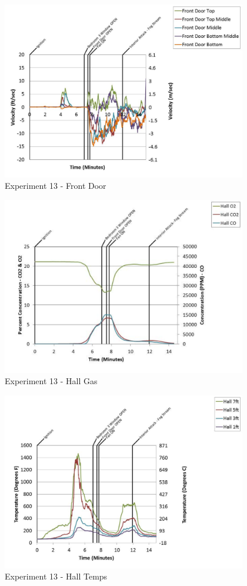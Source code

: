 \documentclass{article}
\begin{document}
\begin{appendices}
	\begin{figure}[h!]
		\centering
		\includegraphics[height=3.05in]{0_Images/Results_Charts/Exp_13_Charts/FrontDoor.pdf}
		\caption{Experiment 13 - Front Door}
	\end{figure}
 
	\clearpage

	\begin{figure}[h!]
		\centering
		\includegraphics[height=3.05in]{0_Images/Results_Charts/Exp_13_Charts/HallGas.pdf}
		\caption{Experiment 13 - Hall Gas}
	\end{figure}
 

	\begin{figure}[h!]
		\centering
		\includegraphics[height=3.05in]{0_Images/Results_Charts/Exp_13_Charts/HallTemps.pdf}
		\caption{Experiment 13 - Hall Temps}
	\end{figure}
 

\end{appendices}
\end{document}
